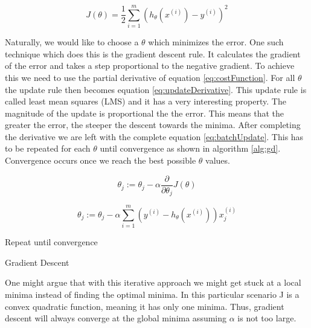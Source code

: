 \documentclass{mproj}
\begin{document}
\begin{equation}
\label{eq:costFunction}
J(\theta) = \frac{1}{2}\sum_{i=1}^{m}( h_\theta(x^{(i)})-y^{(i)})^2
\end{equation}

Naturally, we would like to choose a $\theta$ which minimizes the error. One such technique which does this is the gradient descent rule. It calculates the gradient of the error and takes a step proportional to the negative gradient. To achieve this we need to use the partial derivative of equation \ref{eq:costFunction}. For all $\theta$ the update rule then becomes equation \ref{eq:updateDerivative}. This update rule is called least mean squares (LMS) and it has a very interesting property. The magnitude of the update is proportional the the error. This means that the greater the error, the steeper the descent towards the minima.  After completing the derivative we are left with the complete equation \ref{eq:batchUpdate}. This has to be repeated for each $\theta$ until convergence as shown in algorithm \ref{alg:gd}. Convergence occurs once we reach the best possible $\theta$ values.

\begin{equation}
\label{eq:updateDerivative}
\theta_j := \theta_j - \alpha\frac{\partial}{\partial\theta_j}J(\theta)
\end{equation}

\begin{equation}
\label{eq:batchUpdate}
\theta_j := \theta_j - \alpha\sum_{i=1}^{m}(y^{(i)}-h_\theta(x^{(i)}))x_j^{(i)}
\end{equation}

\begin{algorithm}[H]
Repeat until convergence\;
\caption{Gradient Descent}
\label{alg:gd}
\end{algorithm}

One might argue that with this iterative approach we might get stuck at a local minima instead of finding the optimal minima. In this particular scenario J is a convex quadratic function, meaning it has only one minima. Thus, gradient descent will always converge at the global minima assuming $\alpha$ is not too large.
\end{document}
